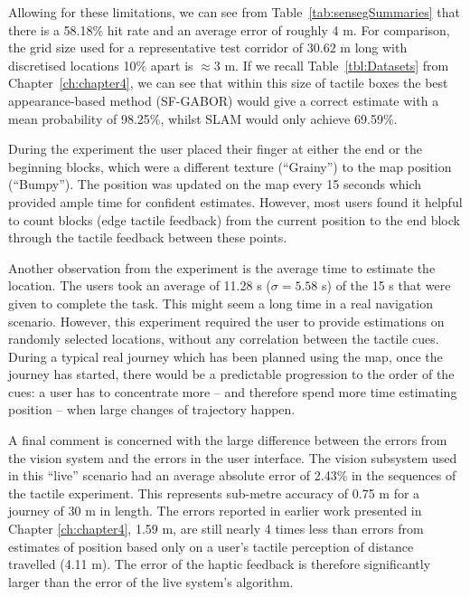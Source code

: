 Allowing for these limitations, we can see from Table~\ref{tab:sensegSummaries} that there is a 58.18\% hit rate and an average error of roughly 4 m. For comparison, the grid size used for a representative test corridor of $30.62$ m long with discretised locations 10\% apart is $\approx 3$ m. If we recall Table~\ref{tbl:Datasets} from Chapter~\ref{ch:chapter4}, we can see that within this size of tactile boxes the best appearance-based method (SF-GABOR) would give a correct estimate with a mean probability of 98.25\%, whilst SLAM would only achieve 69.59\%.

During the experiment the user placed their finger at either the end or the beginning blocks, which were a different texture (``Grainy'') to the map position (``Bumpy''). The position was updated on the map every 15 seconds which provided ample time for confident estimates. However, most users found it helpful to count blocks (edge tactile feedback) from the current position to the end block through the tactile feedback between these points.

Another observation from the experiment is the average time to estimate the location. The users took an average of 11.28 s ($\sigma = 5.58$ s) of the 15 s that were given to complete the task. This might seem a long time in a real navigation scenario. However, this experiment required the user to provide estimations on randomly selected locations, without any correlation between the tactile cues. During a typical real journey which has been planned using the map, once the journey has started, there would be a predictable progression to the order of the cues: a user has to concentrate more -- and therefore spend more time estimating position -- when large changes of trajectory happen.

A final comment is concerned with the large difference between the errors from the vision system and the errors in the user interface. The vision subsystem used in this ``live'' scenario had an average absolute error of 2.43\% in the sequences of the tactile experiment. This represents sub-metre accuracy of 0.75 m for a journey of 30 m in length. The errors reported in earlier work presented in Chapter \ref{ch:chapter4}, 1.59 m, are still nearly 4 times less than errors from estimates of position based only on a user's tactile perception of distance travelled (4.11 m). The error of the haptic feedback is therefore significantly larger than the error of the live system's algorithm.


